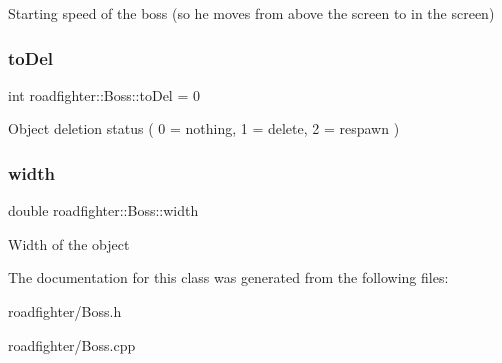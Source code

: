 Starting speed of the boss (so he moves from above the screen to in the screen) \mbox{\label{classroadfighter_1_1Boss_ac9f5ce0c9c356d6096357d48cb14bb5b}} 
\subsubsection{\texorpdfstring{to\+Del}{toDel}}
{\footnotesize\ttfamily int roadfighter\+::\+Boss\+::to\+Del = 0\hspace{0.3cm}{\ttfamily [protected]}}

Object deletion status ( 0 = nothing, 1 = delete, 2 = respawn ) \mbox{\label{classroadfighter_1_1Boss_a963dd4050bb246ed954d5b7e46e8ce0b}} 
\subsubsection{\texorpdfstring{width}{width}}
{\footnotesize\ttfamily double roadfighter\+::\+Boss\+::width\hspace{0.3cm}{\ttfamily [protected]}}

Width of the object 

The documentation for this class was generated from the following files\+:\begin{DoxyCompactItemize}
\item 
roadfighter/Boss.\+h\item 
roadfighter/Boss.\+cpp\end{DoxyCompactItemize}
